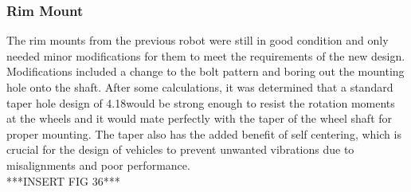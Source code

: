 \subsubsection{Rim Mount}
The rim mounts from the previous robot were still in good condition and only needed minor modifications for them to meet the requirements of the new design. Modifications included a change to the bolt pattern and boring out the mounting hole onto the shaft. After some calculations, it was determined that a standard taper hole design of 4.18\degree would be strong enough to resist the rotation moments at the wheels and it would mate perfectly with the taper of the wheel shaft for proper mounting. The taper also has the added benefit of self centering, which is crucial for the design of vehicles to prevent unwanted vibrations due to misalignments and poor performance. 
\\
***INSERT FIG 36***